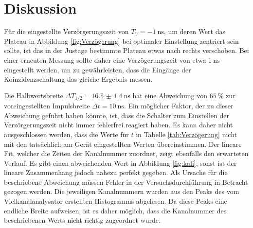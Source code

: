 \section{Diskussion}
Für die eingestellte Verzörgerungszeit von $T_V = \SI{-1}{\nano\second}$, um deren Wert das Plateau 
in Abbildung \ref{fig:Verzögerung} bei optimaler Einstellung zentriert sein sollte, ist das 
in der Justage bestimmte Plateau etwas nach rechts verschoben. Bei einer erneuten Messung sollte daher 
eine Verzögerungszeit von etwa $\SI{1}{\nano\second}$ eingestellt werden, um zu gewährleisten,
dass die Eingänge der Koinzidenzschaltung das gleiche Ergebnis messen. 

Die Halbwertsbreite $\Delta T_{1/2} = \SI{16.5(14)}{\nano \second}$ hat eine Abweichung von $\SI{65}{\percent} $ zur voreingestellten Impulsbreite $\Delta t = \SI{10}{\nano\second}$. 
Ein möglicher Faktor, der zu dieser Abweichung geführt haben könnte, ist, dass die Schalter zum Einstellen der Verzörgerungszeit nicht immer fehlerfrei reagiert haben. 
Es kann daher nicht ausgeschlossen werden, dass die Werte für $t$ in Tabelle \ref{tab:Verzögerung} nicht mit 
den tatsächlich am Gerät eingestellten Werten übereinstimmen.
Der lineare Fit, welcher die Zeiten der Kanalnummer zuordnet, zeigt ebenfalls den erwarteten Verlauf. Es gibt einen 
abweichenden Wert in Abbildung \ref{fig:kali}, sonst ist der lineare Zusammenhang jedoch nahezu perfekt gegeben. 
Als Ursache für die beschriebene Abweichung müssen Fehler in der Versuchsdurchführung in Betracht gezogen werden.
Die jeweiligen Kanalnummern wurden aus den Peaks des vom Vielkanalanalysator
erstellten Histogramms abgelesen. Da diese Peaks eine endliche Breite aufweisen, ist es daher möglich, 
dass die Kanalnummer des beschriebenen Werts nicht richtig zugeordnet wurde.

